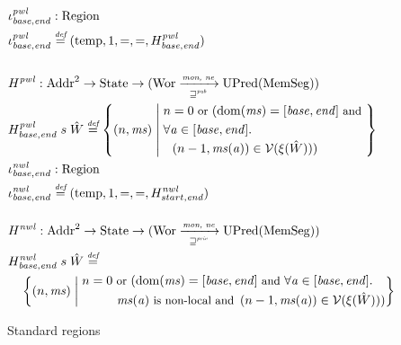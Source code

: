 \documentclass[compsoc,conference,letterpaper,fleqn]{IEEEtran}
\newcommand{\fun}{\rightarrow}
\newcommand{\defeq}{\stackrel{\textit{\tiny{def}}}{=}}
\DeclareMathOperator{\dom}{dom}
\newcommand{\var}[1]{\mathit{#1}}
\newcommand{\hs}{\var{ms}}
\newcommand{\ms}{\hs}
\newcommand{\addr}{\var{a}}
\newcommand{\start}{\var{base}}
\newcommand{\addrend}{\var{end}}
\newcommand{\nwl}{\var{nwl}}
\newcommand{\pwl}{\var{pwl}}
\newcommand{\futurewk}{\mathbin{\sqsupseteq}^{\var{pub}}}
\newcommand{\futurestr}{\mathbin{\sqsupseteq}^{\var{priv}}}
\newcommand{\monwknefun}{\xrightarrow[\text{\tiny{$\futurewk$}}]{\textit{\tiny{mon, ne}}}}
\newcommand{\monstrnefun}{\xrightarrow[\text{\tiny{$\futurestr$}}]{\textit{\tiny{mon, ne}}}}
\newcommand{\asmType}{\plaindom{AsmType}}
\newcommand{\plaindom}[1]{\mathrm{#1}}
\newcommand{\Addrs}{\plaindom{Addr}}
\newcommand{\HeapSegments}{\plaindom{MemSeg}}
\newcommand{\States}{\plaindom{State}}
\newcommand{\Regions}{\plaindom{Region}}
\newcommand{\Wor}{\plaindom{Wor}}
\newcommand{\UPred}[1]{\plaindom{UPred}(#1)}
\newcommand{\intr}[2]{\mathcal{#1}}
\newcommand{\valueintr}[1]{\intr{V}{#1}}
\newcommand{\stdvr}{\valueintr{\asmType}}
\newcommand{\npair}[2][n]{\left(#1,#2 \right)}
\newcommand{\plainview}[1]{\mathrm{#1}}
\newcommand{\temp}{\plainview{temp}}
\newcommand{\nonlocal}[1]{\ensuremath{#1} \text{ is non-local}}
\begin{document}
{\begin{figure}[htbp]
  \centering
  \begin{align*}
  &\iota_{\start,\addrend}^\pwl : \Regions\\
  &\iota_{\start,\addrend}^\pwl \defeq (\temp,1,=,=,H^\pwl_{\start,\addrend}) \\
  \\
  &H^\pwl : \Addrs^2 \fun \States \fun (\Wor \monwknefun \UPred{\HeapSegments})\\
  &H^\pwl_{\start,\addrend}\; s \; \hat{W} \defeq \left\{\npair{\hs} \; \middle| \;
    \begin{aligned}
      & n = 0 \text{\footnotesize{ or }} (\dom(\hs) = [\start,\addrend] \text{\footnotesize{ and }} \\
      &\forall \addr \in [\start,\addrend] \ldotp\\
      & \;\; \npair[n-1]{\hs(\addr)} \in \stdvr(\xi(\hat{W})))
    \end{aligned}
        \right\}\\
  &\iota_{\start,\addrend}^{\nwl} : \Regions \\
  &\iota_{\start,\addrend}^{\nwl} \defeq (\temp,1,=,=,H^\nwl_{start,\addrend}) \\
  \\
  &H^\nwl : \Addrs^2 \fun \States \fun (\Wor \monstrnefun \UPred{\HeapSegments})\\
  &H^\nwl_{\start,\addrend} \; s \;\hat{W} \defeq \\
    &\quad\left\{\npair{\hs} \; \middle| \;
    \begin{multlined}
      n = 0 \text{\footnotesize{ or }} (\dom(\hs) = [\start,\addrend] \text{\footnotesize{ and }} \forall \addr \in [\start,\addrend] \ldotp \\
       {\footnotesize\nonlocal{\ms(\addr)}} \text{\footnotesize{ and }} \npair[n-1]{\hs(\addr)} \in \stdvr(\xi(\hat{W})))
    \end{multlined} \right\}
\end{align*}
\caption{Standard regions}
\label{fig:standard-regions}
\end{figure}

}
\end{document}
